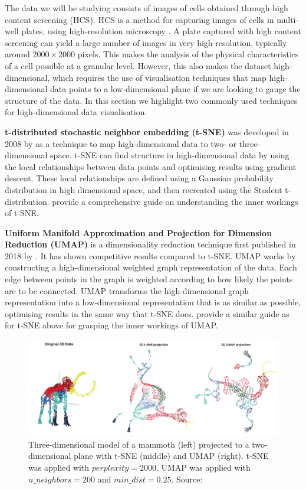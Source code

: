 The data we will be studying consists of images of cells obtained through high content screening (HCS). HCS is a method for capturing images of cells in multi-well plates, using high-resolution microscopy \citep{buchser_assay_2014}. A plate captured with high content screening can yield a large number of images in very high-resolution, typically around $2000\times2000$ pixels. This makes the analysis of the physical characteristics of a cell possible at a granular level. However, this also makes the dataset high-dimensional, which requires the use of visualisation techniques that map high-dimensional data points to a low-dimensional plane if we are looking to gauge the structure of the data. In this section we highlight two commonly used techniques for high-dimensional data visualisation.

\textbf{t-distributed stochastic neighbor embedding (t-SNE)} was developed in 2008 by \citeauthor{vanDerMaaten2008} as a technique to map high-dimensional data to two- or three-dimensional space. t-SNE can find structure in high-dimensional data by using the local relationships between data points and optimising results using gradient descent. These local relationships are defined using a Gaussian probability distribution in high dimensional space, and then recreated using the Student t-distribution. \citet{wattenberg2016how} provide a comprehensive guide on understanding the inner workings of t-SNE. 

\textbf{Uniform Manifold Approximation and Projection for Dimension Reduction (UMAP)} is a dimensionality reduction technique first published in 2018 by \citeauthor{umap_arxiv}. It has shown competitive results compared to t-SNE. UMAP works by constructing a high-dimensional weighted graph representation of the data. Each edge between points in the graph is weighted according to how likely the points are to be connected. UMAP transforms the high-dimensional graph representation into a low-dimensional representation that is as similar as possible, optimising results in the same way that t-SNE does. \citet{Coenon2019} provide a similar guide as for t-SNE above for grasping the inner workings of UMAP.

\begin{figure}[h]
    \centering
    \includegraphics[width=\textwidth]{dissertation/figures/mammoth_vis.pdf}
    \caption{Three-dimensional model of a mammoth (left) projected to a two-dimensional plane with t-SNE (middle) and UMAP (right). t-SNE was applied with  $perplexity=2000$. UMAP was applied with $n\_neighbors=200$ and $min\_dist=0.25$. Source: \citet{Coenon2019}}
    \label{fig:vis_mammoth}
\end{figure}

